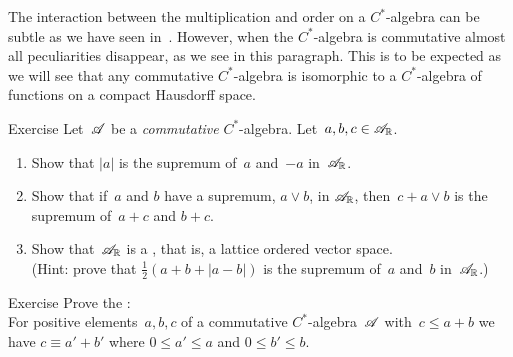 \documentclass[a]{subfiles}
\begin{document}
\begin{parsec}%
\begin{point}%
The interaction between the multiplication and order
on a $C^*$-algebra can be subtle
as we have seen in~\TODO{}.  However,
when the $C^*$-algebra is commutative
almost all peculiarities disappear,
as we see in this paragraph.
This is to be expected
as we will see that any commutative $C^*$-algebra
is isomorphic to a $C^*$-algebra
of functions on a compact Hausdorff space.
\end{point}
\begin{point}{Exercise}%
Let~$\mathscr{A}$ be a \emph{commutative} $C^*$-algebra.
Let~$a,b,c\in\mathscr{A}_{\mathbb{R}}$.
\begin{enumerate}
\item
Show that $\left| a\right|$ is the supremum of~$a$ and~$-a$
in~$\mathscr{A}_{\mathbb{R}}$.
\item
Show that if~$a$ and $b$ have a supremum, $a\vee b$, in $\mathscr{A}_{\mathbb{R}}$,
then~$c+a\vee b$ is the supremum of~$a+c$ and $b+c$.
\item
Show that~$\mathscr{A}_{\mathbb{R}}$ is a ,
that is,  a lattice ordered vector space.\\
(Hint: prove that $\frac{1}{2}(a+b+\left|a-b\right|)$
is the supremum of~$a$ and~$b$ in~$\mathscr{A}_{\mathbb{R}}$.)
\end{enumerate}
\end{point}
\begin{point}{Exercise}%
Prove the :\\
For positive elements~$a,b,c$ of a commutative $C^*$-algebra~$\mathscr{A}$
with~$c\leq a+b$
we have $c\equiv a'+b'$
where  $0\leq a'\leq a$ and $0\leq b'\leq b$.
\end{point}
\end{parsec}
\end{document}

